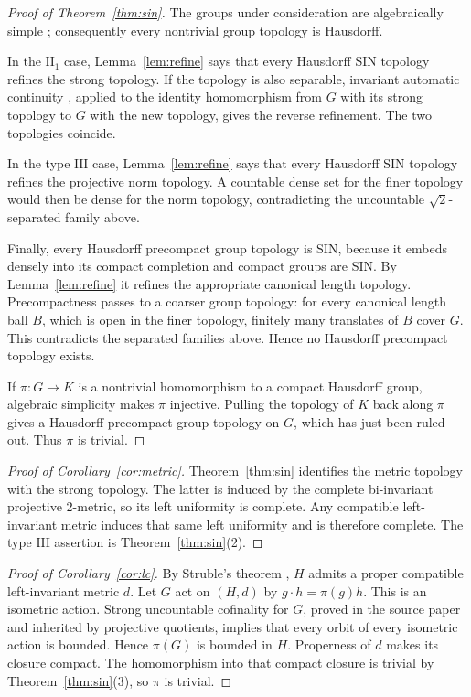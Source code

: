 \documentclass[11pt]{article}
\begin{document}
\begin{proof}[Proof of Theorem~\ref{thm:sin}]
The groups under consideration are algebraically simple
\cite{DTfinite,DTinfinite}; consequently every nontrivial group topology is
Hausdorff.

In the $\mathrm{II}_1$ case, Lemma~\ref{lem:refine} says that every Hausdorff
SIN topology refines the strong topology.  If the topology is also separable,
invariant automatic continuity \cite[Theorem~1.4]{DTfinite}, applied to the
identity homomorphism from $G$ with its strong topology to $G$ with the new
topology, gives the reverse refinement.  The two topologies coincide.

In the type $\mathrm{III}$ case, Lemma~\ref{lem:refine} says that every
Hausdorff SIN topology refines the projective norm topology.  A countable
dense set for the finer topology would then be dense for the norm topology,
contradicting the uncountable $\sqrt2$-separated family above.

Finally, every Hausdorff precompact group topology is SIN, because it embeds
densely into its compact completion and compact groups are SIN.  By
Lemma~\ref{lem:refine} it refines the appropriate canonical length topology.
Precompactness passes to a coarser group topology: for every canonical length
ball $B$, which is open in the finer topology, finitely many translates of
$B$ cover $G$.  This contradicts the separated families above.  Hence no
Hausdorff precompact topology exists.

If $\pi:G\to K$ is a nontrivial homomorphism to a compact Hausdorff group,
algebraic simplicity makes $\pi$ injective.  Pulling the topology of $K$ back
along $\pi$ gives a Hausdorff precompact group topology on $G$, which has just
been ruled out.  Thus $\pi$ is trivial.
\end{proof}

\begin{proof}[Proof of Corollary~\ref{cor:metric}]
Theorem~\ref{thm:sin} identifies the metric topology with the strong topology.
The latter is induced by the complete bi-invariant projective $2$-metric, so
its left uniformity is complete.  Any compatible left-invariant metric induces
that same left uniformity and is therefore complete.  The type
$\mathrm{III}$ assertion is Theorem~\ref{thm:sin}(2).
\end{proof}

\begin{proof}[Proof of Corollary~\ref{cor:lc}]
By Struble's theorem \cite{Struble}, $H$ admits a proper compatible
left-invariant metric $d$.  Let $G$ act on $(H,d)$ by
$g\cdot h=\pi(g)h$.  This is an isometric action.  Strong uncountable
cofinality for $G$, proved in the source paper \cite[Theorems~1.1 and
1.2]{Dowerk} and inherited by projective quotients, implies that every orbit
of every isometric action is bounded.  Hence $\pi(G)$ is bounded in $H$.
Properness of $d$ makes its closure compact.  The homomorphism into that
compact closure is trivial by Theorem~\ref{thm:sin}(3), so $\pi$ is trivial.
\end{proof}
\end{document}
